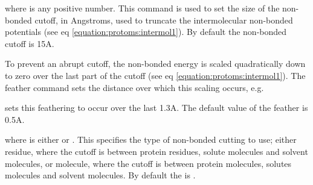 \documentclass[letterpaper,10pt,english]{sphinxmanual}
\begin{document}
\ignorespaces 
\def\sphinxLiteralBlockLabel{\label{\detokenize{protoms:index-35}}}
%
\begin{sphinxVerbatim}[commandchars=\\\{\}]
 
\end{sphinxVerbatim}

where  is any positive number. This command is used to set the size of the non-bonded cutoff, in Angstroms, used to truncate the intermolecular non-bonded potentials (see eq \eqref{equation:protoms:intermol1}). By default the non-bonded cutoff is 15A.

\ignorespaces 
\def\sphinxLiteralBlockLabel{\label{\detokenize{protoms:index-36}}}
%
\begin{sphinxVerbatim}[commandchars=\\\{\}]
 
\end{sphinxVerbatim}

To prevent an abrupt cutoff, the non-bonded energy is scaled quadratically down to zero over the last part of the cutoff (see eq \eqref{equation:protoms:intermol1}). The feather command sets the distance over which this scaling occurs, e.g.

%
\begin{sphinxVerbatim}[commandchars=\\\{\}]
 
\end{sphinxVerbatim}

sets this feathering to occur over the last 1.3A. The default value of the feather is 0.5A.

\ignorespaces 
\def\sphinxLiteralBlockLabel{\label{\detokenize{protoms:index-37}}}
%
\begin{sphinxVerbatim}[commandchars=\\\{\}]
 
\end{sphinxVerbatim}

where  is either  or . This specifies the type of non-bonded cutting to use; either residue, where the cutoff is between protein residues, solute molecules and solvent molecules, or molecule, where the cutoff is between protein molecules, solutes molecules and solvent molecules. By default the  is .
\end{document}
